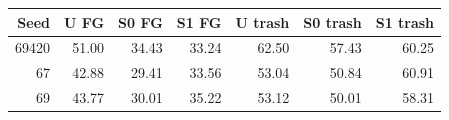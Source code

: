 \begin{tabular}{@{}rrrrrrr@{}}\toprule
Seed & U FG & S0 FG & S1 FG & U trash & S0 trash & S1 trash \\ \midrule
69420 & 51.00 & 34.43 & 33.24 & 62.50 & 57.43 & 60.25 \\
67 & 42.88 & 29.41 & 33.56 & 53.04 & 50.84 & 60.91 \\
69 & 43.77 & 30.01 & 35.22 & 53.12 & 50.01 & 58.31 \\
\bottomrule\end{tabular}
